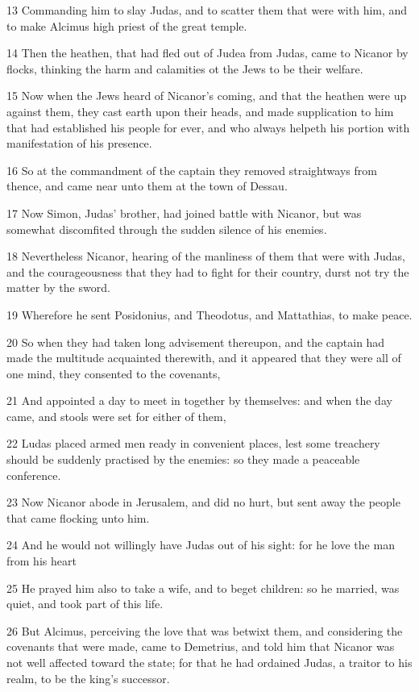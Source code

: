 \par 13 Commanding him to slay Judas, and to scatter them that were with him, and to make Alcimus high priest of the great temple.
\par 14 Then the heathen, that had fled out of Judea from Judas, came to Nicanor by flocks, thinking the harm and calamities ot the Jews to be their welfare.
\par 15 Now when the Jews heard of Nicanor's coming, and that the heathen were up against them, they cast earth upon their heads, and made supplication to him that had established his people for ever, and who always helpeth his portion with manifestation of his presence.
\par 16 So at the commandment of the captain they removed straightways from thence, and came near unto them at the town of Dessau.
\par 17 Now Simon, Judas' brother, had joined battle with Nicanor, but was somewhat discomfited through the sudden silence of his enemies.
\par 18 Nevertheless Nicanor, hearing of the manliness of them that were with Judas, and the courageousness that they had to fight for their country, durst not try the matter by the sword.
\par 19 Wherefore he sent Posidonius, and Theodotus, and Mattathias, to make peace.
\par 20 So when they had taken long advisement thereupon, and the captain had made the multitude acquainted therewith, and it appeared that they were all of one mind, they consented to the covenants,
\par 21 And appointed a day to meet in together by themselves: and when the day came, and stools were set for either of them,
\par 22 Ludas placed armed men ready in convenient places, lest some treachery should be suddenly practised by the enemies: so they made a peaceable conference.
\par 23 Now Nicanor abode in Jerusalem, and did no hurt, but sent away the people that came flocking unto him.
\par 24 And he would not willingly have Judas out of his sight: for he love the man from his heart
\par 25 He prayed him also to take a wife, and to beget children: so he married, was quiet, and took part of this life.
\par 26 But Alcimus, perceiving the love that was betwixt them, and considering the covenants that were made, came to Demetrius, and told him that Nicanor was not well affected toward the state; for that he had ordained Judas, a traitor to his realm, to be the king's successor.
